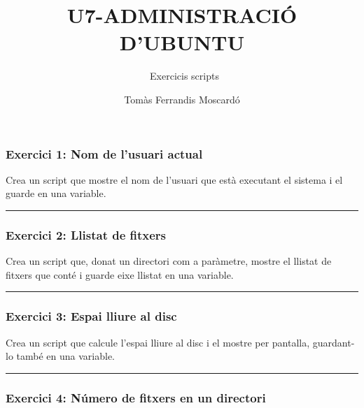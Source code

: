 \documentclass[
  12 pt,
  a4paper,
]{article}
\title{U7-ADMINISTRACIÓ D'UBUNTU}
\subtitle{~Exercicis scripts}
\author{Tomàs Ferrandis Moscardó}
\date{}
\begin{document}
\maketitle

\subsubsection{\texorpdfstring{\textbf{Exercici 1: Nom de l'usuari
actual}}{Exercici 1: Nom de l'usuari actual}}\label{exercici-1-nom-de-lusuari-actual}

Crea un script que mostre el nom de l'usuari que està executant el
sistema i el guarde en una variable.

\begin{center}\rule{0.5\linewidth}{0.5pt}\end{center}

\subsubsection{\texorpdfstring{\textbf{Exercici 2: Llistat de
fitxers}}{Exercici 2: Llistat de fitxers}}\label{exercici-2-llistat-de-fitxers}

Crea un script que, donat un directori com a paràmetre, mostre el
llistat de fitxers que conté i guarde eixe llistat en una variable.

\begin{center}\rule{0.5\linewidth}{0.5pt}\end{center}

\subsubsection{\texorpdfstring{\textbf{Exercici 3: Espai lliure al
disc}}{Exercici 3: Espai lliure al disc}}\label{exercici-3-espai-lliure-al-disc}

Crea un script que calcule l'espai lliure al disc i el mostre per
pantalla, guardant-lo també en una variable.

\begin{center}\rule{0.5\linewidth}{0.5pt}\end{center}

\subsubsection{\texorpdfstring{\textbf{Exercici 4: Número de fitxers en
un
directori}}{Exercici 4: Número de fitxers en un directori}}\label{exercici-4-nuxfamero-de-fitxers-en-un-directori}
\end{document}
